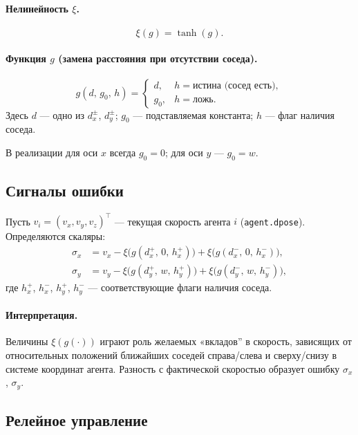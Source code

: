 \documentclass[12pt,a4paper]{article}
\begin{document}
\paragraph{Нелинейность $\xi$.}
\begin{equation}
  \xi(g) = \tanh(g).
\end{equation}

\paragraph{Функция $g$ (замена расстояния при отсутствии соседа).}
\begin{equation}
  g(d,\, g_0,\, h) =
  \begin{cases}
    d,   & h = \text{истина (сосед есть)}, \\
    g_0, & h = \text{ложь}.
  \end{cases}
\label{eq:g}
\end{equation}
Здесь $d$ --- одно из $d_x^\pm$, $d_y^\pm$; $g_0$ --- подставляемая константа; $h$ --- флаг наличия соседа.

В реализации для оси $x$ всегда $g_0 = 0$; для оси $y$ --- $g_0 = w$.

\subsection{Сигналы ошибки}

Пусть $v_i = (v_x, v_y, v_z)^\top$ --- текущая скорость агента $i$ (\texttt{agent.dpose}). Определяются скаляры:
\begin{align}
  \sigma_x &= v_x - \xi\!\bigl(g(d_x^+,\, 0,\, h_x^+)\bigr) + \xi\!\bigl(g(d_x^-,\, 0,\, h_x^-)\bigr), \label{eq:sigma_x} \\
  \sigma_y &= v_y - \xi\!\bigl(g(d_y^+,\, w,\, h_y^+)\bigr) + \xi\!\bigl(g(d_y^-,\, w,\, h_y^-)\bigr), \label{eq:sigma_y}
\end{align}
где $h_x^+$, $h_x^-$, $h_y^+$, $h_y^-$ --- соответствующие флаги наличия соседа.

\paragraph{Интерпретация.}
Величины $\xi(g(\cdot))$ играют роль желаемых «вкладов'' в скорость, зависящих от относительных положений ближайших соседей справа/слева и сверху/снизу в системе координат агента. Разность с фактической скоростью образует ошибку $\sigma_x$, $\sigma_y$.

\subsection{Релейное управление}
\end{document}
